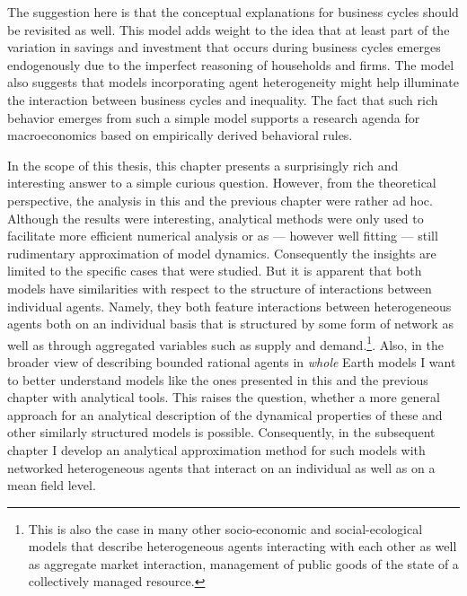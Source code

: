 The suggestion here is that the conceptual explanations for business cycles should be revisited as well.  This model adds weight to the idea that at least part of the variation in savings and investment that occurs during business cycles emerges endogenously due to the imperfect reasoning of households and firms.  The model also suggests that models incorporating agent heterogeneity might help illuminate the interaction between business cycles and inequality.  The fact that such rich behavior emerges from such a simple model supports a research agenda for macroeconomics based on empirically derived behavioral rules.

In the scope of this thesis, this chapter presents a surprisingly rich and interesting answer to a simple curious question. However, from the theoretical perspective, the analysis in this and the previous chapter were rather ad hoc. Although the results were interesting, analytical methods were only used to facilitate more efficient numerical analysis or as --- however well fitting --- still rudimentary approximation of model dynamics. Consequently the insights are limited to the specific cases that were studied. But it is apparent that both models have similarities with respect to the structure of interactions between individual agents. Namely, they both feature interactions between heterogeneous agents both on an individual basis that is structured by some form of network as well as through aggregated variables such as supply and demand.\footnote{This is also the case in many other socio-economic and social-ecological models that describe heterogeneous agents interacting with each other as well as aggregate market interaction, management of public goods of the state of a collectively managed resource.}. Also, in the broader view of describing bounded rational agents in \emph{whole} Earth models I want to better understand models like the ones presented in this and the previous chapter with analytical tools. This raises the question, whether a more general approach for an analytical description of the dynamical properties of these and other similarly structured models is possible. Consequently, in the subsequent chapter I develop an analytical approximation method for such models with networked heterogeneous agents that interact on an individual as well as on a mean field level.
